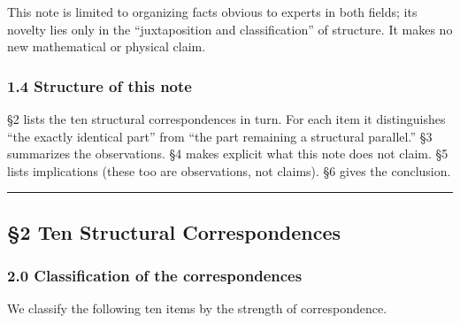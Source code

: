 \documentclass[
]{article}
\begin{document}
This note is limited to organizing facts obvious to experts in both
fields; its novelty lies only in the ``juxtaposition and
classification'' of structure. It makes no new mathematical or physical
claim.

\subsubsection{1.4 Structure of this note}\label{structure-of-this-note}

§2 lists the ten structural correspondences in turn. For each item it
distinguishes ``the exactly identical part'' from ``the part remaining a
structural parallel.'' §3 summarizes the observations. §4 makes explicit
what this note does not claim. §5 lists implications (these too are
observations, not claims). §6 gives the conclusion.

\begin{center}\rule{0.5\linewidth}{0.5pt}\end{center}

\subsection{§2 Ten Structural
Correspondences}\label{ten-structural-correspondences}

\subsubsection{2.0 Classification of the
correspondences}\label{classification-of-the-correspondences}

We classify the following ten items by the strength of correspondence.
\end{document}
